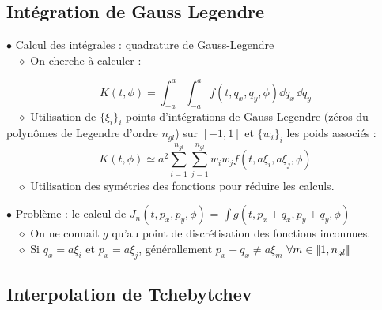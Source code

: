 \documentclass[9pt]{beamer}
\begin{document}
		
	\subsection{Intégration de Gauss Legendre}
	
	
	\begin{frame}
	\justifying
	\vspace*{22pt}
	
	$\bullet$ Calcul des intégrales : quadrature de Gauss-Legendre \\
	$\quad \diamond$ On cherche à calculer : 
	
	\begin{equation*}
		K(t,\phi) = \int_{-a}^{a} \int_{-a}^{a} f(t, q_x, q_y,\phi) \dd q_x \, \dd q_y 
	\end{equation*}
	$\quad \diamond$ Utilisation de $\{\xi_i\}_i$ points d'intégrations de Gauss-Legendre (zéros du polynômes de Legendre d'ordre $n_{gl}$) sur $[-1,1]$ et $\{w_i\}_i$ les poids associés :
	\begin{equation*}
		K(t, \phi) \simeq a^2 \sum_{i=1}^{n_{gl}} \sum_{j=1}^{n_{gl}} w_i w_j f(t,a\xi_i, a\xi_j,\phi) 
	\end{equation*}
	$\quad \diamond$ Utilisation des symétries des fonctions pour réduire les calculs.
	
	\vspace*{11pt}
	$\bullet$ Problème : le calcul de $J_n(t,p_x, p_y,\phi)$ = $\int g(t,p_x+q_x, p_y+q_y, \phi)$\\
		$\quad \diamond$ On ne connait $g$ qu'au point de discrétisation des fonctions inconnues.\\
		$\quad \diamond$ Si $q_x = a\xi_i$ et $p_x = a\xi_j$, générallement $p_x+q_x \neq a\xi_m$ $\forall m \in  \llbracket 1, n_{gl} \rrbracket $
	

	
	\end{frame}
	
	\vspace*{11pt}
	

	
	\subsection{Interpolation de Tchebytchev}
	
\end{document}
